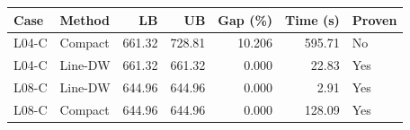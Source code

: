 \begin{tabular}{llrrrrl}
\hline
Case & Method & LB & UB & Gap (\%) & Time (s) & Proven \\
\hline
L04-C & Compact & 661.32 & 728.81 & 10.206 & 595.71 & No \\
L04-C & Line-DW & 661.32 & 661.32 & 0.000 & 22.83 & Yes \\
L08-C & Line-DW & 644.96 & 644.96 & 0.000 & 2.91 & Yes \\
L08-C & Compact & 644.96 & 644.96 & 0.000 & 128.09 & Yes \\
\hline
\end{tabular}
